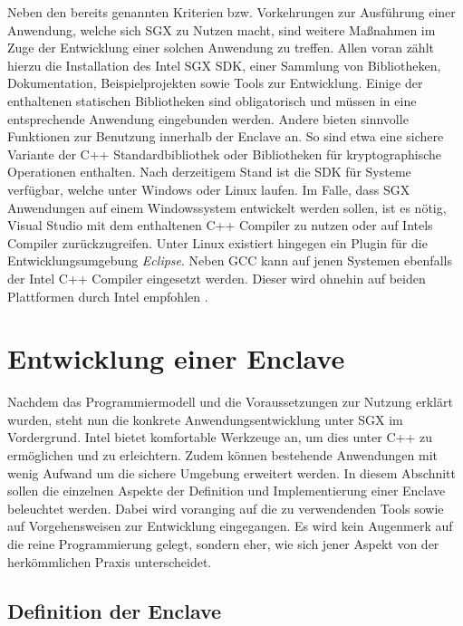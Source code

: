Neben den bereits genannten Kriterien bzw. Vorkehrungen zur Ausführung einer Anwendung, welche sich \ac{SGX} zu Nutzen macht, sind weitere Maßnahmen im Zuge der Entwicklung einer solchen Anwendung zu treffen. Allen voran zählt hierzu die Installation des Intel \ac{SGX} \ac{SDK}, einer Sammlung von Bibliotheken, Dokumentation, Beispielprojekten sowie Tools zur Entwicklung. Einige der enthaltenen statischen Bibliotheken sind obligatorisch und müssen in eine entsprechende Anwendung eingebunden werden. Andere bieten sinnvolle Funktionen zur Benutzung innerhalb der Enclave an. So sind etwa eine sichere Variante der C++ Standardbibliothek oder Bibliotheken für kryptographische Operationen enthalten. Nach derzeitigem Stand ist die \ac{SDK} für Systeme verfügbar, welche unter Windows oder Linux laufen. Im Falle, dass \ac{SGX} Anwendungen auf einem Windowssystem entwickelt werden sollen, ist es nötig, Visual Studio mit dem enthaltenen C++ Compiler zu nutzen oder auf Intels Compiler zurückzugreifen. Unter Linux existiert hingegen ein Plugin für die Entwicklungsumgebung \textit{Eclipse}. Neben GCC kann auf jenen Systemen ebenfalls der Intel C++ Compiler eingesetzt werden. Dieser wird ohnehin auf beiden Plattformen durch Intel empfohlen \cite{WinDev}.

\section{Entwicklung einer Enclave}

Nachdem das Programmiermodell und die Voraussetzungen zur Nutzung erklärt wurden, steht nun die konkrete Anwendungsentwicklung unter \ac{SGX} im Vordergrund. Intel bietet komfortable Werkzeuge an, um dies unter C++ zu ermöglichen und zu erleichtern. Zudem können bestehende Anwendungen mit wenig Aufwand um die sichere Umgebung erweitert werden. In diesem Abschnitt sollen die einzelnen Aspekte der Definition und Implementierung einer Enclave beleuchtet werden. Dabei wird voranging auf die zu verwendenden Tools sowie auf Vorgehensweisen zur Entwicklung eingegangen. Es wird kein Augenmerk auf die reine Programmierung gelegt, sondern eher, wie sich jener Aspekt von der herkömmlichen Praxis unterscheidet.

\subsection{Definition der Enclave}

